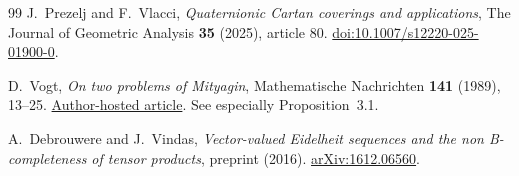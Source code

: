 \documentclass[11pt,a4paper]{article}
\numberwithin{equation}{section}
\theoremstyle{definition}
\theoremstyle{remark}
\theoremstyle{plain}
\begin{document}
\begin{thebibliography}{99}
J.~Prezelj and F.~Vlacci, \emph{Quaternionic Cartan coverings and applications}, The Journal of Geometric Analysis \textbf{35} (2025), article 80. \href{https://doi.org/10.1007/s12220-025-01900-0}{doi:10.1007/s12220-025-01900-0}.

D.~Vogt, \emph{On two problems of Mityagin}, Mathematische Nachrichten \textbf{141} (1989), 13--25. \href{https://www2.math.uni-wuppertal.de/~vogt/preprints/Eigene/44.pdf}{Author-hosted article}. See especially Proposition~3.1.

A.~Debrouwere and J.~Vindas, \emph{Vector-valued Eidelheit sequences and the non B-completeness of tensor products}, preprint (2016). \href{https://arxiv.org/abs/1612.06560}{arXiv:1612.06560}.

\end{thebibliography}
\end{document}

